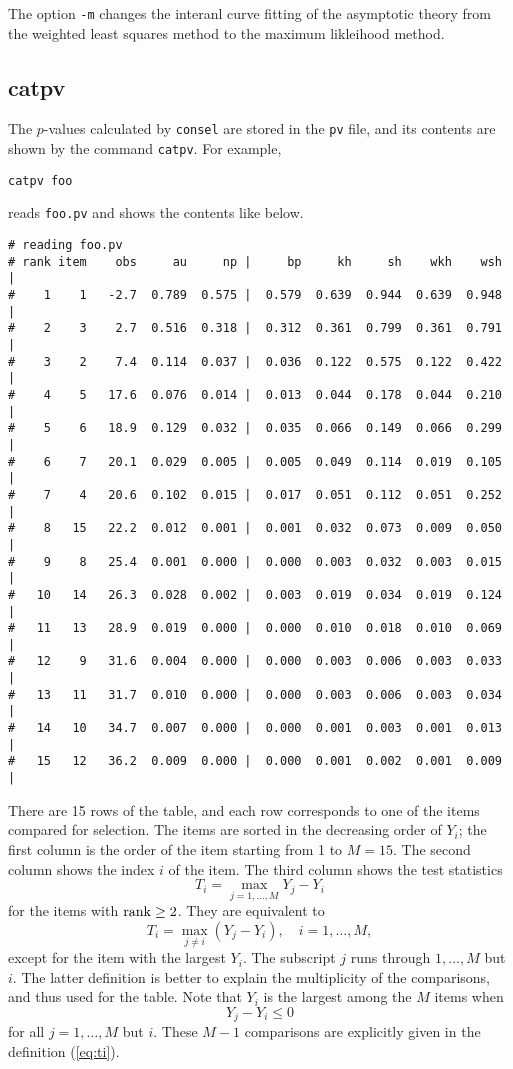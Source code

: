 \documentclass[12pt]{article}
\newcommand{\refeq}[1]{(\ref{eq:#1})}
\begin{document}
The option {\tt -m} changes the interanl curve fitting of the asymptotic
theory from the weighted least squares method to the maximum likleihood
method.


\subsection{catpv}

The $p$-values calculated by {\tt consel} are stored in the {\tt pv}
file, and its contents are shown by the command {\tt catpv}. For
example,
\begin{verbatim}
catpv foo
\end{verbatim}
reads {\tt foo.pv} and shows the contents like below.
{\small
\begin{verbatim}
# reading foo.pv
# rank item    obs     au     np |     bp     kh     sh    wkh    wsh |
#    1    1   -2.7  0.789  0.575 |  0.579  0.639  0.944  0.639  0.948 |
#    2    3    2.7  0.516  0.318 |  0.312  0.361  0.799  0.361  0.791 |
#    3    2    7.4  0.114  0.037 |  0.036  0.122  0.575  0.122  0.422 |
#    4    5   17.6  0.076  0.014 |  0.013  0.044  0.178  0.044  0.210 |
#    5    6   18.9  0.129  0.032 |  0.035  0.066  0.149  0.066  0.299 |
#    6    7   20.1  0.029  0.005 |  0.005  0.049  0.114  0.019  0.105 |
#    7    4   20.6  0.102  0.015 |  0.017  0.051  0.112  0.051  0.252 |
#    8   15   22.2  0.012  0.001 |  0.001  0.032  0.073  0.009  0.050 |
#    9    8   25.4  0.001  0.000 |  0.000  0.003  0.032  0.003  0.015 |
#   10   14   26.3  0.028  0.002 |  0.003  0.019  0.034  0.019  0.124 |
#   11   13   28.9  0.019  0.000 |  0.000  0.010  0.018  0.010  0.069 |
#   12    9   31.6  0.004  0.000 |  0.000  0.003  0.006  0.003  0.033 |
#   13   11   31.7  0.010  0.000 |  0.000  0.003  0.006  0.003  0.034 |
#   14   10   34.7  0.007  0.000 |  0.000  0.001  0.003  0.001  0.013 |
#   15   12   36.2  0.009  0.000 |  0.000  0.001  0.002  0.001  0.009 |
\end{verbatim}
}

There are 15 rows of the table, and each row corresponds to one of the
items compared for selection. The items are sorted in the decreasing
order of $Y_i$; the first column is the order of the item starting from
1 to $M=15$. The second column shows the index $i$ of the item. The
third column shows the test statistics \[ T_i = \max_{j=1,\ldots,M} Y_j
- Y_i \] for the items with ${\rm rank} \ge 2$. They are equivalent to
\begin{equation}
 T_i = \max_{j\neq i} (Y_j - Y_i), \quad i=1,\ldots,M, \label{eq:ti}
\end{equation}
except for the item with the largest $Y_i$. The subscript $j$ runs
through $1,\ldots,M$ but $i$. The latter definition is better to explain
the multiplicity of the comparisons, and thus used for the table. Note
that $Y_i$ is the largest among the $M$ items when \[ Y_j - Y_i \le 0 \]
for all $j=1,\ldots,M$ but $i$. These $M-1$ comparisons are explicitly
given in the definition \refeq{ti}.
\end{document}
